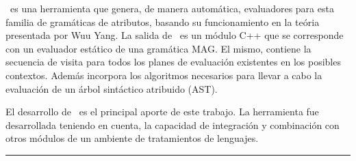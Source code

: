 \documentclass[a4paper,11pt]{ThesisStyle}
\begin{document}
\begin{vcenterpage}
\maggen\ es una herramienta que genera, de manera automática, evaluadores para esta familia de gramáticas de atributos, basando su funcionamiento en la teória presentada por Wuu Yang. La salida de \maggen\ es un módulo C++ que se corresponde con un evaluador estático de una gramática MAG. El mismo, contiene la secuencia de visita para todos los planes de evaluación existentes en los posibles contextos. Además incorpora los algoritmos necesarios para llevar a cabo la evaluación de un árbol sintáctico atribuido (AST).

El desarrollo de \maggen\ es el principal aporte de este trabajo. La herramienta fue desarrollada teniendo en cuenta, la capacidad de integración y combinación con otros módulos de un ambiente de tratamientos de lenguajes.

% 

\noindent\rule[2pt]{\textwidth}{0.5pt}

\end{vcenterpage}

\cleardoublepage
\end{document}
